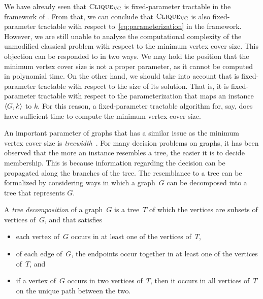 We have already seen that $\textnormal{\textsc{Clique}}_{\textnormal{\textsc{VC}}}$ is fixed-parameter tractable in the framework of \citeauthor{downey1999parameterized}.
From that, we can conclude that $\textnormal{\textsc{Clique}}_{\textnormal{\textsc{VC}}}$ is also fixed-parameter tractable with respect to~\eqref{eq:parameterization} in the \citeauthor{flum2006parameterized} framework.
However, we are still unable to analyze the computational complexity of the unmodified classical  problem with respect to the minimum vertex cover size.
This objection can be responded to in two ways.
We may hold the position that the minimum vertex cover size is not a proper parameter, as it cannot be computed in polynomial time.
On the other hand, we should take into account that  is fixed-parameter tractable with respect to the size of its solution.
That is, it is fixed-parameter tractable with respect to the parameterization that maps an instance ${\langle G, k\rangle}$ to $k$.
For this reason, a fixed-parameter tractable algorithm for, say,  does have sufficient time to compute the minimum vertex cover size.

An important parameter of graphs that has a similar issue as the minimum vertex cover size is \emph{treewidth}~\parencite{robertson1986graph,bodlaender1998partial}.
For many decision problems on graphs, it has been observed that the more an instance resembles a tree, the easier it is to decide membership.
This is because information regarding the decision can be propagated along the branches of the tree.
The resemblance to a tree can be formalized by considering ways in which a graph~$G$ can be decomposed into a tree that represents $G$.
\begin{definition}
  A \emph{tree decomposition} of a graph~$G$ is a tree~$T$ of which the vertices are subsets of vertices of~$G$, and that satisfies
  \begin{itemize}
  \item
    each vertex of~$G$ occurs in at least one of the vertices of~$T$,
  \item
    of each edge of~$G$, the endpoints occur together in at least one of the vertices of~$T$, and
  \item
    if a vertex of~$G$ occurs in two vertices of~$T$, then it occurs in all vertices of~$T$ on the unique path between the two.
  \end{itemize}
\end{definition}

